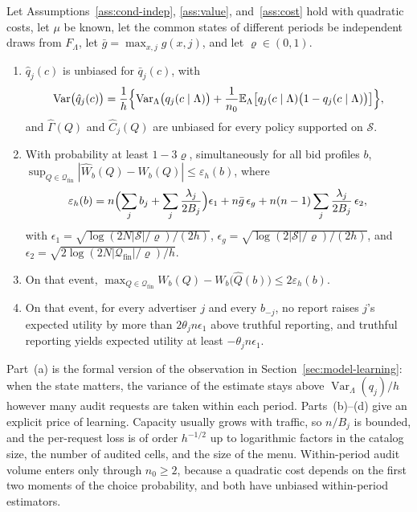 \documentclass[opre,dblanonrev]{informs4}
\providecommand{\E}{\mathbb{E}}
\providecommand{\1}{\mathbf{1}}
\providecommand{\Var}{\operatorname{Var}}
\begin{document}
\begin{proposition}\label{prop:learning}
Let Assumptions~\ref{ass:cond-indep}, \ref{ass:value}, and~\ref{ass:cost} hold with quadratic costs, let $\mu$ be known, let the common states of different periods be independent draws from $F_\Lambda$, let $\bar g=\max_{x,j}g(x,j)$, and let $\varrho\in(0,1)$.
\begin{enumerate}
\item[(a)] $\hat q_j(c)$ is unbiased for $\bar q_j(c)$, with
\[
\Var\bigl(\hat q_j(c)\bigr)=\frac1h\Bigl\{\Var_\Lambda\bigl(q_j(c\mid\Lambda)\bigr)+\frac1{n_0}\E_\Lambda\bigl[q_j(c\mid\Lambda)\bigl(1-q_j(c\mid\Lambda)\bigr)\bigr]\Bigr\},
\]
and $\hat\Gamma(Q)$ and $\hat C_j(Q)$ are unbiased for every policy supported on $\mathcal S$.
\item[(b)] With probability at least $1-3\varrho$, simultaneously for all bid profiles $b$, $\sup_{Q\in\mathcal Q_{\mathrm{fin}}}|\hat W_b(Q)-W_b(Q)|\le\varepsilon_h(b)$, where
\[
\varepsilon_h(b)=n\Bigl(\sum_jb_j+\sum_j\frac{\lambda_j}{2B_j}\Bigr)\epsilon_1+n\bar g\,\epsilon_g+n(n-1)\sum_j\frac{\lambda_j}{2B_j}\,\epsilon_2,
\]
with $\epsilon_1=\sqrt{\log(2N|\mathcal S|/\varrho)/(2h)}$, $\epsilon_g=\sqrt{\log(2|\mathcal S|/\varrho)/(2h)}$, and $\epsilon_2=\sqrt{2\log(2N|\mathcal Q_{\mathrm{fin}}|/\varrho)/h}$.
\item[(c)] On that event, $\max_{Q\in\mathcal Q_{\mathrm{fin}}}W_b(Q)-W_b\bigl(\hat Q(b)\bigr)\le2\varepsilon_h(b)$.
\item[(d)] On that event, for every advertiser $j$ and every $b_{-j}$, no report raises $j$'s expected utility by more than $2\theta_jn\epsilon_1$ above truthful reporting, and truthful reporting yields expected utility at least $-\theta_jn\epsilon_1$.
\end{enumerate}
\end{proposition}

Part~(a) is the formal version of the observation in Section~\ref{sec:model-learning}: when the state matters, the variance of the estimate stays above $\Var_\Lambda(q_j)/h$ however many audit requests are taken within each period. Parts~(b)--(d) give an explicit price of learning. Capacity usually grows with traffic, so $n/B_j$ is bounded, and the per-request loss is of order $h^{-1/2}$ up to logarithmic factors in the catalog size, the number of audited cells, and the size of the menu. Within-period audit volume enters only through $n_0\ge2$, because a quadratic cost depends on the first two moments of the choice probability, and both have unbiased within-period estimators.
\end{document}
